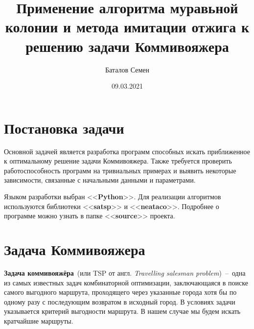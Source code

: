 \documentclass[12pt, a4paper]{article}
\title{Применение алгоритма муравьной колонии и метода имитации отжига к 
    решению задачи Коммивояжера}
\author{Баталов Семен}
\date{09.03.2021}
\begin{document}
    
    \sloppy
    
    \maketitle
    
    \section{Постановка задачи}
    
    Основной задачей является разработка программ способных искать 
    приближенное к оптимальному решение задачи Коммивояжера. Также требуется 
    проверить работоспособность программ на тривиальных примерах и выявить 
    некоторые зависимости, связанные с начальными данными и параметрами.
    
    Языком разработки выбран <<\textbf{Python}>>. Для реализации алгоритмов 
    используются библиотеки <<\textbf{satsp}>> и <<\textbf{neataco}>>. 
    Подробнее о программе можно узнать в папке <<\textbf{source}>> проекта.
    
    \section{Задача Коммивояжера}
    
    \textbf{Задача коммивояжёра}~(или TSP от англ. \textit{Travelling 
    salesman problem})~--~одна из самых известных задач комбинаторной 
    оптимизации, заключающаяся в поиске самого выгодного маршрута, 
    проходящего через указанные города хотя бы по одному разу с последующим 
    возвратом в исходный город. В условиях задачи указывается критерий 
    выгодности маршрута. В нашем случае мы будем искать кратчайшие маршруты.
    
\end{document}
